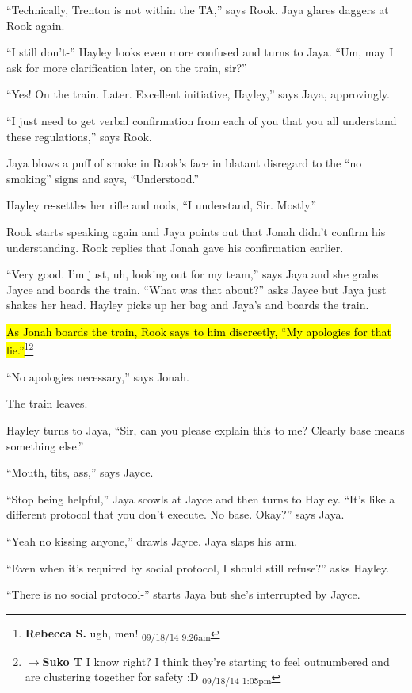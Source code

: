 ``Technically, Trenton is not within the TA,'' says Rook.  Jaya glares daggers at Rook again.

``I still don't-'' Hayley looks even more confused and turns to Jaya. ``Um, may I ask for more clarification later, on the train, sir?''

``Yes!  On the train. Later.  Excellent initiative, Hayley,'' says Jaya, approvingly.

``I just need to get verbal confirmation from each of you that you all understand these regulations,'' says Rook.

Jaya blows a puff of smoke in Rook's face in blatant disregard to the ``no smoking'' signs and says, ``Understood.''

Hayley re-settles her rifle and nods, ``I understand, Sir.  Mostly.''

Rook starts speaking again and Jaya points out that Jonah didn't confirm his understanding.  Rook replies that Jonah gave his confirmation earlier.  

``Very good.  I'm just, uh, looking out for my team,'' says Jaya and she grabs Jayce and boards the train.  ``What was that about?'' asks Jayce but Jaya just shakes her head. Hayley picks up her bag and Jaya's and boards the train.

\hl{As Jonah boards the train, Rook says to him discreetly, ``My apologies for that lie.''}\footnote{\textbf{Rebecca S. }ugh, men! \textsubscript{09/18/14 9:26am}}\footnote{$\rightarrow$\textbf{Suko T }I know right?  I think they're starting to feel outnumbered and are clustering together for safety  :D \textsubscript{09/18/14 1:05pm}}

``No apologies necessary,'' says Jonah.

The train leaves.



Hayley turns to Jaya, ``Sir, can you please explain this to me?  Clearly base means something else.''

``Mouth, tits, ass,'' says Jayce.

``Stop being helpful,'' Jaya scowls at Jayce and then turns to Hayley.  ``It's like a different protocol that you don't execute.  No base.  Okay?'' says Jaya.

``Yeah no kissing anyone,'' drawls Jayce.  Jaya slaps his arm.

``Even when it's required by social protocol, I should still refuse?'' asks Hayley.

``There is no social protocol-'' starts Jaya but she's interrupted by Jayce.  

